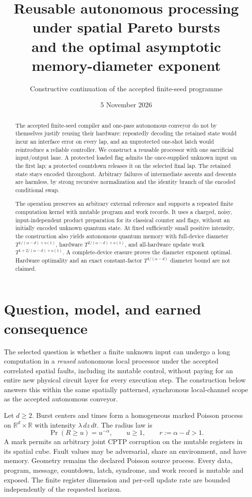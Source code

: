 \documentclass[11pt]{article}
\title{Reusable autonomous processing under spatial Pareto bursts\\
and the optimal asymptotic memory-diameter exponent}
\author{Constructive continuation of the accepted finite-seed programme}
\date{5 November 2026}
\begin{document}
\maketitle

\begin{abstract}
The accepted finite-seed compiler and one-pass autonomous conveyor do not by
themselves justify reusing their hardware: repeatedly decoding the retained
state would incur an interface error on every lap, and an unprotected
one-shot latch would reintroduce a reliable controller. We construct a
reusable processor with one sacrificial input/output lane. A protected
loaded flag admits the once-supplied unknown input on the first lap; a
protected countdown releases it on the selected final lap. The retained
state stays encoded throughout. Arbitrary failures of intermediate ascents
and descents are harmless, by strong recursive normalization and the
identity branch of the encoded conditional swap.

The operation preserves an arbitrary external reference and supports a
repeated finite computation kernel with mutable program and work records.
It uses a charged, noisy, input-independent product preparation for its
classical counter and flags, without an initially encoded unknown quantum
state. At fixed sufficiently small positive intensity, the construction
also yields autonomous quantum memory with full-device diameter
$T^{1/(\alpha-d)+o(1)}$, hardware
$T^{2/(\alpha-d)+o(1)}$, and all-hardware update work
$T^{1+2/(\alpha-d)+o(1)}$. A complete-device erasure proves the diameter
exponent optimal. Hardware optimality and an exact constant-factor
$T^{1/(\alpha-d)}$ diameter bound are not claimed.
\end{abstract}

\section{Question, model, and earned consequence}

The selected question is whether a finite unknown input can undergo a long
computation in a \emph{reused} autonomous local processor under the accepted
correlated spatial faults, including its mutable control, without paying
for an entire new physical circuit layer for every execution step. The
construction below answers this within the same spatially patterned,
synchronous local-channel scope as the accepted autonomous conveyor.

Let $d\geq2$. Burst centers and times form a homogeneous marked Poisson
process on $\mathbb R^d\times\mathbb R$ with intensity $\lambda\,dz\,dt$.
The radius law is
\[
 \Pr(R\geq u)=u^{-\alpha},\qquad u\geq1,
 \qquad r:=\alpha-d>1.
\]
A mark permits an arbitrary joint CPTP corruption on the mutable registers
in its spatial cube. Fault values may be adversarial, share an environment,
and have memory. Geometry remains the declared Poisson source process.
Every data, program, message, countdown, latch, syndrome, and work record
is mutable and exposed. The finite register dimension and per-cell update
rate are bounded independently of the requested horizon.
\end{document}
